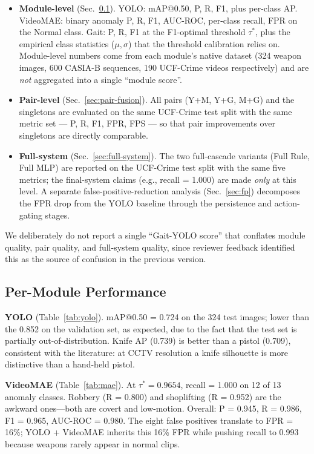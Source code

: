 \documentclass[runningheads]{llncs}
\begin{document}
\begin{algorithm}[!htbp]
\begin{itemize}\setlength{\itemsep}{1pt}
  \item \textbf{Module-level} (Sec.~\ref{sec:per-module}). YOLO: mAP@0.50, P, R, F1, plus per-class AP. VideoMAE: binary anomaly P, R, F1, AUC-ROC, per-class recall, FPR on the Normal class. Gait: P, R, F1 at the F1-optimal threshold $\tau^*$, plus the empirical class statistics ($\mu, \sigma$) that the threshold calibration relies on. Module-level numbers come from each module's native dataset (324 weapon images, 600 CASIA-B sequences, 190 UCF-Crime videos respectively) and are \emph{not} aggregated into a single ``module score''.
  \item \textbf{Pair-level} (Sec.~\ref{sec:pair-fusion}). All pairs (Y+M, Y+G, M+G) and the singletons are evaluated on the same UCF-Crime test split with the same metric set --- P, R, F1, FPR, FPS --- so that pair improvements over singletons are directly comparable.
  \item \textbf{Full-system} (Sec.~\ref{sec:full-system}). The two full-cascade variants (Full Rule, Full MLP) are reported on the UCF-Crime test split with the same five metrics; the final-system claims (e.g., recall = 1.000) are made \emph{only} at this level. A separate false-positive-reduction analysis (Sec.~\ref{sec:fp}) decomposes the FPR drop from the YOLO baseline through the persistence and action-gating stages.
\end{itemize}

We deliberately do not report a single ``Gait-YOLO score'' that conflates module quality, pair quality, and full-system quality, since reviewer feedback identified this as the source of confusion in the previous version.

\subsection{Per-Module Performance}\label{sec:per-module}

\textbf{YOLO} (Table~\ref{tab:yolo}). mAP@0.50 = 0.724 on the 324 test images; lower than the 0.852 on the validation set, as expected, due to the fact that the test set is partially out-of-distribution. Knife AP (0.739) is better than a pistol (0.709), consistent with the literature: at CCTV resolution a knife silhouette is more distinctive than a hand-held pistol.

\textbf{VideoMAE} (Table~\ref{tab:mae}). At $\tau^* = 0.9654$, recall = 1.000 on 12 of 13 anomaly classes. Robbery (R = 0.800) and shoplifting (R = 0.952) are the awkward ones—both are covert and low-motion. Overall: P = 0.945, R = 0.986, F1 = 0.965, AUC-ROC = 0.980. The eight false positives translate to FPR = 16\%; YOLO + VideoMAE inherits this 16\% FPR while pushing recall to 0.993 because weapons rarely appear in normal clips.


\end{algorithm}
\end{document}
